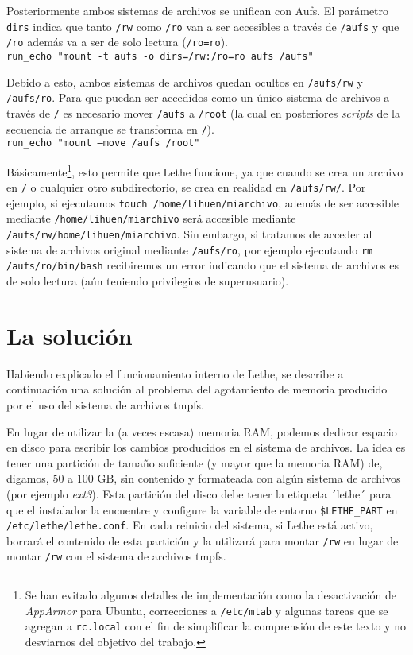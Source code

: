 \documentclass[a4paper,10pt]{article}
\begin{document}
Posteriormente ambos sistemas de archivos se unifican con Aufs. El parámetro \texttt{dirs} indica que tanto \texttt{/rw} como
\texttt{/ro} van a ser accesibles a través de \texttt{/aufs} y que \texttt{/ro} además va a ser de solo lectura
(\texttt{/ro=ro}). 
\\\indent\texttt{run\_echo "mount -t aufs -o dirs=/rw:/ro=ro aufs /aufs"}

Debido a esto, ambos sistemas de archivos quedan ocultos en \texttt{/aufs/rw} y \texttt{/aufs/ro}. Para que puedan ser
accedidos como un único sistema de archivos a través de \texttt{/} es necesario mover \texttt{/aufs} a \texttt{/root} (la
cual en posteriores \textit{scripts} de la secuencia de arranque se transforma en \texttt{/}).
\\\indent\texttt{run\_echo "mount --move /aufs /root"}

Básicamente\footnote{Se han evitado algunos detalles de implementación como la desactivación de \textit{AppArmor}
para Ubuntu, correcciones a \texttt{/etc/mtab} y algunas tareas que se agregan a \texttt{rc.local} con el fin de simplificar
la comprensión de este texto y no desviarnos del objetivo del trabajo.}, esto permite que Lethe funcione, ya que cuando se
crea un archivo en \texttt{/} o cualquier otro subdirectorio, se crea en realidad en \texttt{/aufs/rw/}. Por ejemplo, si
ejecutamos \texttt{touch /home/lihuen/miarchivo}, además de ser accesible mediante \texttt{/home/lihuen/miarchivo} será
accesible mediante \texttt{/aufs/rw/home/lihuen/miarchivo}. Sin embargo, si tratamos de acceder al sistema de archivos
original mediante \texttt{/aufs/ro}, por ejemplo ejecutando \texttt{rm /aufs/ro/bin/bash} recibiremos un error indicando que
el sistema de archivos es de solo lectura (aún teniendo privilegios de superusuario).

\section{La solución}
Habiendo explicado el funcionamiento interno de Lethe, se describe a continuación una solución al problema del agotamiento
de memoria producido por el uso del sistema de archivos tmpfs.

En lugar de utilizar la (a veces escasa) memoria RAM, podemos dedicar espacio en disco para escribir los cambios producidos
en el sistema de archivos. La idea es tener una partición de tamaño suficiente (y mayor que la memoria RAM) de, digamos, 50 a
100 GB, sin contenido y formateada con algún sistema de archivos (por ejemplo \textit{ext3}). Esta partición del disco debe
tener la etiqueta ´lethe´ para que el instalador la encuentre y configure la variable de entorno \texttt{\$LETHE\_PART} en
\texttt{/etc/lethe/lethe.conf}. En cada reinicio del sistema, si Lethe está activo, borrará el contenido de esta partición y
la utilizará para montar \texttt{/rw} en lugar de montar \texttt{/rw} con el sistema de archivos tmpfs.
\end{document}
